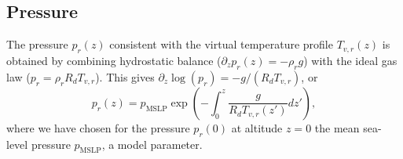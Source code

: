 \documentclass{report}
\begin{document}

\subsection{Pressure}

The pressure $p_r(z)$ consistent with the virtual temperature profile $T_{v,r}(z)$ is obtained by combining hydrostatic balance ($\partial_z p_r(z) = - \rho_r g$) with the ideal gas law ($p_r =\rho_r R_d T_{v, r}$). This gives $\partial_z \log(p_r) = -g/(R_d T_{v, r})$, or
\begin{equation}\label{e:hydro_pressure_gen}
p_r(z) = p_{\mathrm{MSLP}} \exp\left(-\int_0^z \frac{g}{R_d T_{v, r}(z')} dz' \right),
\end{equation}
where we have chosen for the pressure $p_r(0)$ at altitude $z=0$ the mean sea-level pressure $p_{\mathrm{MSLP}}$, a model parameter. 
\end{document}
